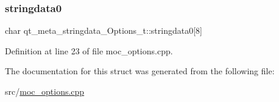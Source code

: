 \mbox{\label{structqt__meta__stringdata___options__t_aa4baf2a8e48fc69ab81a2e828077d167}} 
\subsubsection{\texorpdfstring{stringdata0}{stringdata0}}
{\footnotesize\ttfamily char qt\+\_\+meta\+\_\+stringdata\+\_\+\+Options\+\_\+t\+::stringdata0\mbox{[}8\mbox{]}}



Definition at line 23 of file moc\+\_\+options.\+cpp.



The documentation for this struct was generated from the following file\+:\begin{DoxyCompactItemize}
\item 
src/\mbox{\hyperlink{moc__options_8cpp}{moc\+\_\+options.\+cpp}}\end{DoxyCompactItemize}
